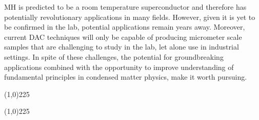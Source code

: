 \documentclass[esp]{FCEFyN-class}
\begin{document}
MH is predicted to be a room temperature superconductor and therefore has potentially revolutionary applications in many fields. However, given it is yet to be confirmed in the lab, potential applications remain years away. Moreover, current DAC techniques will only be capable of producing micrometer scale samples that are challenging to study in the lab, let alone use in industrial settings. In spite of these challenges, the potential for groundbreaking applications combined with the opportunity to improve understanding of fundamental principles in condensed matter physics, make it worth pursuing.


\vspace{10mm} %

\vspace{5mm} %

\line(1,0){225}

\printbibliography


\line(1,0){225}
\end{document}
